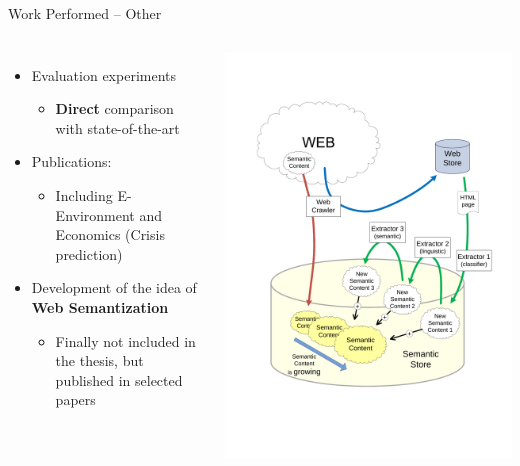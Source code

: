 \documentclass[xcolor=dvipsnames]{beamer}
\begin{document}
\begin{frame}{Work Performed -- Other}
\begin{columns}
\begin{itemize}
	\item Evaluation experiments 	
	\begin{itemize}
		\item \textbf{Direct} comparison with state-of-the-art		
	\end{itemize}
	\item Publications:		
	\begin{itemize}
		\item Including E-Environment and Economics (Crisis prediction)
	\end{itemize}	
	\item Development of the idea of \textbf{Web Semantization}	
	\begin{itemize}
		\item Finally not included in the thesis, but published in selected papers
	\end{itemize}
\end{itemize}
\includegraphics[height=0.5\vsize]{img/growing_semantization}
\end{columns}	
\end{frame}
\end{document}

